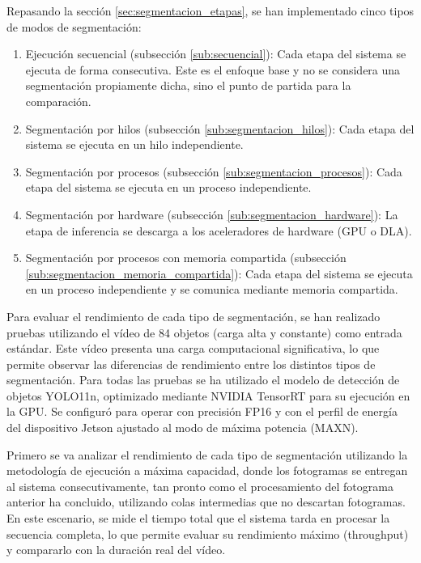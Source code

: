 \documentclass[11pt,spanish,listoffigures,listoftables]{tfgetsinf}
\begin{document}
Repasando la sección \ref{sec:segmentacion_etapas}, se han implementado cinco tipos de modos de segmentación:
\begin{enumerate}
   \item Ejecución secuencial (subsección \ref{sub:secuencial}): Cada etapa del sistema se ejecuta de forma consecutiva. Este es el enfoque base y no se considera una segmentación propiamente dicha, sino el punto de partida para la comparación.
   \item Segmentación por hilos (subsección \ref{sub:segmentacion_hilos}): Cada etapa del sistema se ejecuta en un hilo independiente.
   \item Segmentación por procesos (subsección \ref{sub:segmentacion_procesos}): Cada etapa del sistema se ejecuta en un proceso independiente.
   \item Segmentación por hardware (subsección \ref{sub:segmentacion_hardware}): La etapa de inferencia se descarga a los aceleradores de hardware (GPU o DLA).
   \item Segmentación por procesos con memoria compartida (subsección \ref{sub:segmentacion_memoria_compartida}): Cada etapa del sistema se ejecuta en un proceso independiente y se comunica mediante memoria compartida.
\end{enumerate}

Para evaluar el rendimiento de cada tipo de segmentación, se han realizado pruebas utilizando el vídeo de 84 objetos (carga alta y constante) como entrada estándar. Este vídeo presenta una carga computacional significativa, lo que permite observar las diferencias de rendimiento entre los distintos tipos de segmentación. Para todas las pruebas se ha utilizado el modelo de detección de objetos YOLO11n, optimizado mediante NVIDIA TensorRT para su ejecución en la GPU. Se configuró para operar con precisión FP16 y con el perfil de energía del dispositivo Jetson ajustado al modo de máxima potencia (MAXN). 


Primero se va analizar el rendimiento de cada tipo de segmentación utilizando la metodología de ejecución a máxima capacidad, donde los fotogramas se entregan al sistema consecutivamente, tan pronto como el procesamiento del fotograma anterior ha concluido, utilizando colas intermedias que no descartan fotogramas. En este escenario, se mide el tiempo total que el sistema tarda en procesar la secuencia completa, lo que permite evaluar su rendimiento máximo (throughput) y compararlo con la duración real del vídeo.
\end{document}
